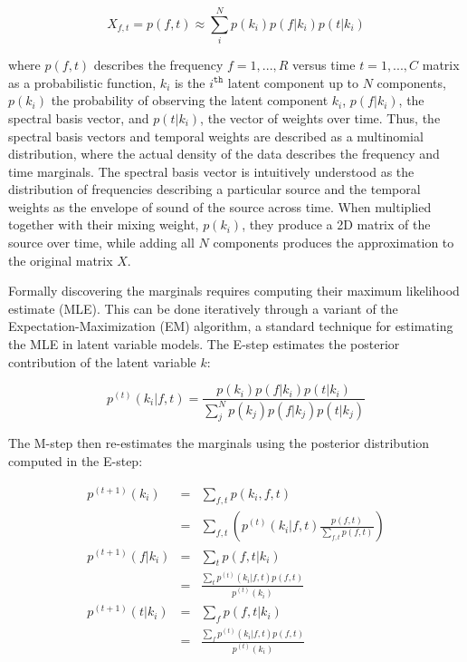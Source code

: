 \begin{equation}\label{eq:plca}
X_{f,t} = p(f,t) \approx \sum\limits_{i}^{N}p(k_i)p(f|k_i)p(t|k_i)  
\end{equation}

where $p(f,t)$ describes the frequency $f = {1,...,R}$ versus time $t = {1,...,C}$ matrix as a probabilistic function, $k_i$ is the $i^{\mathtt{th}}$ latent component up to $N$ components, $p(k_i)$ the probability of observing the latent component $k_i$, $p(f|k_i)$, the spectral basis vector, and $p(t|k_i)$, the vector of weights over time.  Thus, the spectral basis vectors and temporal weights are described as a multinomial distribution, where the actual density of the data describes the frequency and time marginals.  The spectral basis vector is intuitively understood as the distribution of frequencies describing a particular source and the temporal weights as the envelope of sound of the source across time.  When multiplied together with their mixing weight, $p(k_i)$, they produce a 2D matrix of the source over time, while adding all $N$ components produces the approximation to the original matrix $X$.  

Formally discovering the marginals requires computing their maximum likelihood estimate (MLE).  This can be done iteratively through a variant of the Expectation-Maximization (EM) algorithm, a standard technique for estimating the MLE in latent variable models.  The E-step estimates the posterior contribution of the latent variable $k$:

\begin{equation}
p^{(t)}(k_i|f,t) = \frac{p(k_i)p(f|k_i)p(t|k_i)}{\sum_{j}^{N}p(k_j)p(f|k_j)p(t|k_j)}  
\end{equation}

The M-step then re-estimates the marginals using the posterior distribution computed in the E-step:

\begin{eqnarray}
p^{(t+1)}(k_i) &=& \sum_{f,t}p(k_i,f,t)  \\
&=& \sum_{f,t}\left(p^{(t)}(k_i|f,t)\frac{p(f,t)}{\sum_{f,t}p(f,t)}\right)  \\
p^{(t+1)}(f|k_i) &=& \sum_{t}p(f,t|k_i)  \\
&=& \frac{\sum_{t}p^{(t)}(k_i|f,t)p(f,t)}{p^{(t)}(k_i)}  \\
p^{(t+1)}(t|k_i) &=& \sum_{f}p(f,t|k_i)  \\
&=& \frac{\sum_{f}p^{(t)}(k_i|f,t)p(f,t)}{p^{(t)}(k_i)}  
\end{eqnarray}

